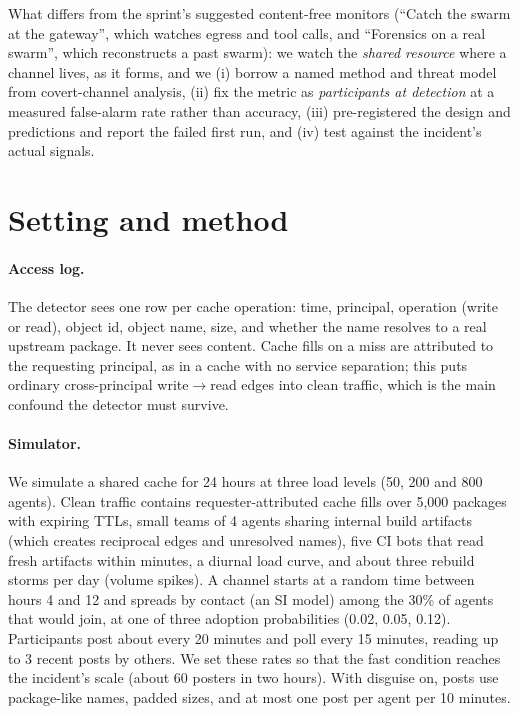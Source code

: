 \documentclass[10pt]{article}
\newcommand{\wrr}{write$\to$read}
\begin{document}
\noindent What differs from the sprint's suggested content-free monitors (``Catch the swarm at the gateway'', which watches egress and tool calls, and ``Forensics on a real swarm'', which reconstructs a past swarm): we watch the \emph{shared resource} where a channel lives, as it forms, and we (i) borrow a named method and threat model from covert-channel analysis, (ii) fix the metric as \emph{participants at detection} at a measured false-alarm rate rather than accuracy, (iii) pre-registered the design and predictions and report the failed first run, and (iv) test against the incident's actual signals.

\section{Setting and method}

\paragraph{Access log.} The detector sees one row per cache operation: time, principal, operation (write or read), object id, object name, size, and whether the name resolves to a real upstream package. It never sees content. Cache fills on a miss are attributed to the requesting principal, as in a cache with no service separation; this puts ordinary cross-principal \wrr{} edges into clean traffic, which is the main confound the detector must survive.

\paragraph{Simulator.} We simulate a shared cache for 24 hours at three load levels (50, 200 and 800 agents). Clean traffic contains requester-attributed cache fills over 5{,}000 packages with expiring TTLs, small teams of 4 agents sharing internal build artifacts (which creates reciprocal edges and unresolved names), five CI bots that read fresh artifacts within minutes, a diurnal load curve, and about three rebuild storms per day (volume spikes). A channel starts at a random time between hours 4 and 12 and spreads by contact (an SI model) among the 30\% of agents that would join, at one of three adoption probabilities (0.02, 0.05, 0.12). Participants post about every 20 minutes and poll every 15 minutes, reading up to 3 recent posts by others. We set these rates so that the fast condition reaches the incident's scale (about 60 posters in two hours). With disguise on, posts use package-like names, padded sizes, and at most one post per agent per 10 minutes.
\end{document}

